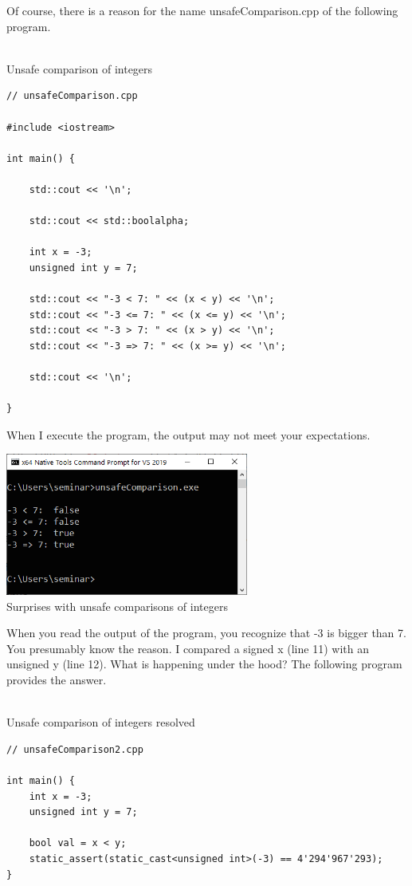 Of course, there is a reason for the name unsafeComparison.cpp of the following program.

\hspace*{\fill} \\ %
\noindent
Unsafe comparison of integers
\begin{lstlisting}[style=styleCXX]
// unsafeComparison.cpp

#include <iostream>

int main() {
	
	std::cout << '\n';
	
	std::cout << std::boolalpha;
	
	int x = -3;
	unsigned int y = 7;
	
	std::cout << "-3 < 7: " << (x < y) << '\n';
	std::cout << "-3 <= 7: " << (x <= y) << '\n';
	std::cout << "-3 > 7: " << (x > y) << '\n';
	std::cout << "-3 => 7: " << (x >= y) << '\n';
	
	std::cout << '\n';

}
\end{lstlisting}

When I execute the program, the output may not meet your expectations.

\begin{center}
\includegraphics[width=0.6\textwidth]{content/3/chapter5/images/16.png}\\
Surprises with unsafe comparisons of integers
\end{center}

When you read the output of the program, you recognize that -3 is bigger than 7. You presumably know the reason. I compared a signed x (line 11) with an unsigned y (line 12). What is happening under the hood? The following program provides the answer.

\hspace*{\fill} \\ %
\noindent
Unsafe comparison of integers resolved
\begin{lstlisting}[style=styleCXX]
// unsafeComparison2.cpp

int main() {
	int x = -3;
	unsigned int y = 7;
	
	bool val = x < y;
	static_assert(static_cast<unsigned int>(-3) == 4'294'967'293);
}
\end{lstlisting}

